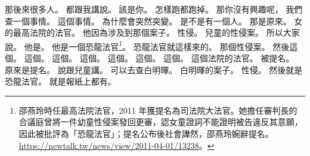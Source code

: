 \hypertarget{c01:cue:3259}{}那後來很多人。
\hypertarget{c01:cue:3260}{}都跟我講說。
\hypertarget{c01:cue:3261}{}該是你。
\hypertarget{c01:cue:3262}{}怎樣跑都跑掉。
\hypertarget{c01:cue:3263}{}那你沒有興趣呢，
\hypertarget{c01:cue:3264}{}我們查一個事情。
\hypertarget{c01:cue:3265}{}這個事情。
\hypertarget{c01:cue:3266}{}為什麼會突然突變。
\hypertarget{c01:cue:3267}{}是不是有一個人。
\hypertarget{c01:cue:3268}{}那是原來。
\hypertarget{c01:cue:3269}{}女的最高法院的法官。
\hypertarget{c01:cue:3270}{}他因為涉及到那個案子。
\hypertarget{c01:cue:3271}{}性侵。
\hypertarget{c01:cue:3272}{}兒童的性侵案。
\hypertarget{c01:cue:3273}{}所以大家說。
\hypertarget{c01:cue:3274}{}他是。
\hypertarget{c01:cue:3275}{}他是一個恐龍法官\footnote{邵燕玲時任最高法院法官，2011 年獲提名為司法院大法官。她擔任審判長的合議庭曾將一件幼童性侵案發回更審，認女童證詞不能證明被告違反其意願，因此被批評為「恐龍法官」；提名公布後社會譁然，邵燕玲婉辭提名。\url{https://newtalk.tw/news/view/2011-04-01/13238}。}。
\hypertarget{c01:cue:3276}{}恐龍法官就這樣來的。
\hypertarget{c01:cue:3277}{}那個性侵案。
\hypertarget{c01:cue:3278}{}然後這個。
\hypertarget{c01:cue:3279}{}這個。
\hypertarget{c01:cue:3280}{}這個。
\hypertarget{c01:cue:3281}{}這個。
\hypertarget{c01:cue:3282}{}這個。
\hypertarget{c01:cue:3283}{}這個。
\hypertarget{c01:cue:3284}{}這個。
\hypertarget{c01:cue:3285}{}這個法院的法官。
\hypertarget{c01:cue:3286}{}被提名。
\hypertarget{c01:cue:3287}{}原來是提名。
\hypertarget{c01:cue:3288}{}說跟兒童講。
\hypertarget{c01:cue:3289}{}可以去查白明暉。
\hypertarget{c01:cue:3290}{}白明暉的案子。
\hypertarget{c01:cue:3291}{}性侵。
\hypertarget{c01:cue:3292}{}然後就是恐龍法官。
\hypertarget{c01:cue:3293}{}就是報紙上都有。

